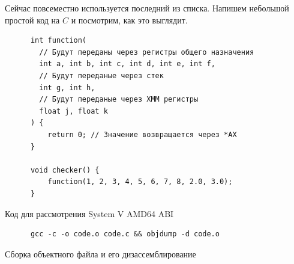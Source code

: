\documentclass[a4paper]{article}
\begin{document}
  Сейчас повсеместно используется последний из списка. Напишем небольшой
  простой код на $C$ и посмотрим, как это выглядит.

  \begin{listing}[H]
    \begin{verbatim}
      int function(
        // Будут переданы через регистры общего назначения
        int a, int b, int c, int d, int e, int f,
        // Будут переданые через стек
        int g, int h,
        // Будут переданые через XMM регистры
        float j, float k
      ) {
          return 0; // Значение возвращается через *AX
      }

      void checker() {
          function(1, 2, 3, 4, 5, 6, 7, 8, 2.0, 3.0);
      }
    \end{verbatim}
    \caption{Код для рассмотрения System V AMD64 ABI}
  \end{listing}

  \begin{listing}[H]
    \begin{verbatim}
      gcc -c -o code.o code.c && objdump -d code.o
    \end{verbatim}
    \caption{Сборка объектного файла и его дизассемблирование}
  \end{listing}
  
\end{document}
